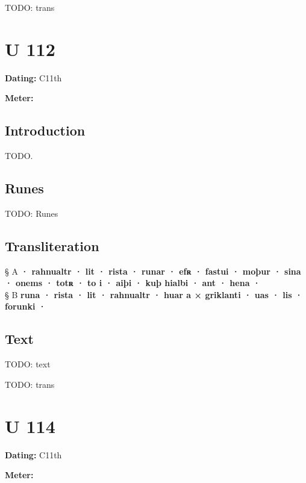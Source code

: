 \bvb TODO: trans\evb\evg

\sectionline\clearpage


\section{U 112}

\begin{flushright}%
\textbf{Dating:} C11th

\textbf{Meter:} \Fornyrdislag
\end{flushright}%

\subsection{Introduction}

TODO.


\subsection{Runes}

TODO: Runes%

\subsection{Transliteration}

§ A \textbf{· rahnualtr · lit · rista · runar · efʀ · fastui · moþur · sina · onems · totʀ · to i · aiþi · kuþ hialbi · ant · hena ·} \\
§ B \textbf{runa · rista · lit · rahnualtr · huar a × griklanti · uas · lis · forunki ·}

\subsection{Text}

\bpg\bpa[0]%
TODO: text\epa

\bpb TODO: trans\epb\epg

\sectionline\clearpage


\section{U 114}

\begin{flushright}%
\textbf{Dating:} C11th

\textbf{Meter:} \Fornyrdislag
\end{flushright}%

